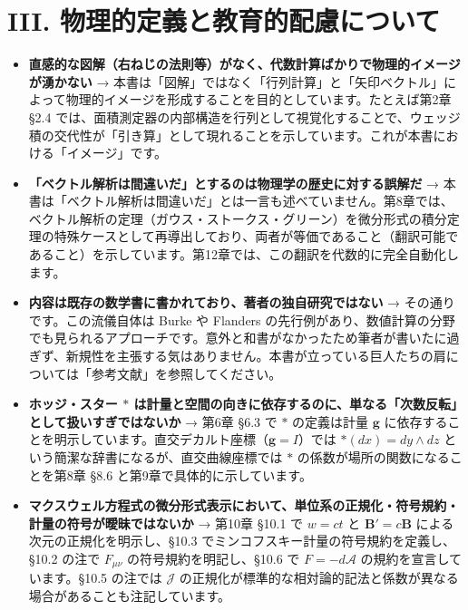 \documentclass[a4paper,12pt,openany]{book}
\begin{document}
\hypertarget{iii.-ux7269ux7406ux7684ux5b9aux7fa9ux3068ux6559ux80b2ux7684ux914dux616eux306bux3064ux3044ux3066}{%
\section{III.
物理的定義と教育的配慮について}\label{iii.-ux7269ux7406ux7684ux5b9aux7fa9ux3068ux6559ux80b2ux7684ux914dux616eux306bux3064ux3044ux3066}}

\begin{itemize}
\item
  \textbf{直感的な図解（右ねじの法則等）がなく、代数計算ばかりで物理的イメージが湧かない}
  →
  本書は「図解」ではなく「行列計算」と「矢印ベクトル」によって物理的イメージを形成することを目的としています。たとえば第2章
  §2.4
  では、面積測定器の内部構造を行列として視覚化することで、ウェッジ積の交代性が「引き算」として現れることを示しています。これが本書における「イメージ」です。
\item
  \textbf{「ベクトル解析は間違いだ」とするのは物理学の歴史に対する誤解だ}
  →
  本書は「ベクトル解析は間違いだ」とは一言も述べていません。第8章では、ベクトル解析の定理（ガウス・ストークス・グリーン）を微分形式の積分定理の特殊ケースとして再導出しており、両者が等価であること（翻訳可能であること）を示しています。第12章では、この翻訳を代数的に完全自動化します。
\item
  \textbf{内容は既存の数学書に書かれており、著者の独自研究ではない} →
  その通りです。この流儀自体は Burke や Flanders
  の先行例があり、数値計算の分野でも見られるアプローチです。意外と和書がなかったため筆者が書いたに過ぎず、新規性を主張する気はありません。本書が立っている巨人たちの肩については「参考文献」を参照してください。
\item
  \textbf{ホッジ・スター $\ast$ は計量と空間の向きに依存するのに、単なる「次数反転」として扱いすぎではないか}
  → 第6章 §6.3 で \(\ast\) の定義は計量 \(\mathbf{g}\)
  に依存することを明示しています。直交デカルト座標（\(\mathbf{g}=I\)）では
  \(\ast(dx)=dy\wedge dz\) という簡潔な辞書になるが、直交曲線座標では
  \(\ast\) の係数が場所の関数になることを第8章 §8.6
  と第9章で具体的に示しています。
\item
  \textbf{マクスウェル方程式の微分形式表示において、単位系の正規化・符号規約・計量の符号が曖昧ではないか}
  → 第10章 §10.1 で \(w=ct\) と \(\mathbf{B}'=c\mathbf{B}\)
  による次元の正規化を明示し、§10.3
  でミンコフスキー計量の符号規約を定義し、§10.2 の注で \(F_{\mu\nu}\)
  の符号規約を明記し、§10.6 で \(F=-d\mathcal{A}\)
  の規約を宣言しています。§10.5 の注では \(\mathcal{J}\)
  の正規化が標準的な相対論的記法と係数が異なる場合があることも注記しています。

\end{itemize}
\end{document}
